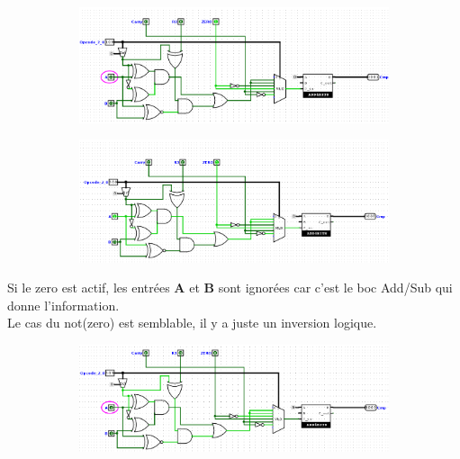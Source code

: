 \documentclass[a4paper]{article}
\begin{document}
\begin{tcolorbox}[colframe=Monokaimagenta,colback=white]
\begin{center}
\begin{figure}[H]
    \begin{subfigure}{.7\textwidth}
        \centering
        \includegraphics[width=.8\linewidth]{src/COMP_TEST_AegB1.png}
        \label{fig:COMPARATEUR_l_EXEMPLE}
   \end{subfigure}
   
   \begin{subfigure}{.7\textwidth}
        \centering
        \includegraphics[width=.8\linewidth]{src/COMP_TEST_AegB.png}
        \label{fig:COMPARATEUR_l_EXEMPLE_1}
   \end{subfigure}


\end{figure}

Si le zero est actif, les entrées \textbf{A} et \textbf{B} sont ignorées car c'est le boc Add/Sub qui donne l'information.\\
Le cas du not(zero) est semblable, il y a juste un inversion logique.

\smallskip

\begin{figure}[H]
    \centering
    
    \begin{subfigure}{.7\textwidth}
        \centering
        \includegraphics[width=.8\linewidth]{src/COMP_TEST_AcarB.png}
        \label{fig:COMPARATEUR_l_EXEMPLE}
   \end{subfigure}
   

\end{figure}
\end{center}
\end{tcolorbox}
\end{document}
